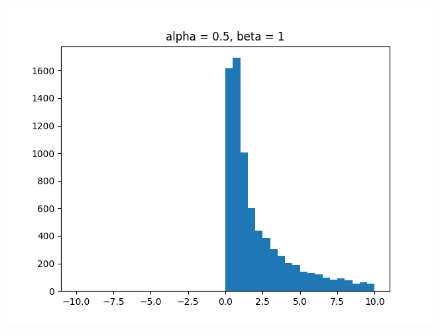 \documentclass[11pt, twocolumn]{article}
\begin{document}
\begin{figure}[h]
\begin{minipage}{0.2\textwidth}
        \includegraphics[width=\textwidth]{q4_1_a0.5_b1}
    \end{minipage}


\end{figure}
\end{document}
